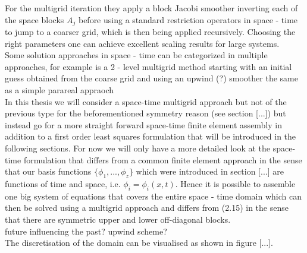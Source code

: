 \documentclass[fleqn, a4paper, 11pt, bibliography=totoc]{report}
\begin{document}
For the multigrid iteration they apply a block Jacobi smoother inverting each of the space blocks $A_j$ before using a standard restriction operators in space - time to jump to a coarser grid, which is then being applied recursively. Choosing the right parameters one can achieve excellent scaling results for large systems. 
\smallskip
\\
Some solution approaches in space - time can be categorized in multiple approaches, for example is a 2 - level multigrid method starting with an initial guess obtained from the coarse grid and using an upwind (?) smoother the same as a simple parareal appraoch \cite{}  
\smallskip
\\
In this thesis we will consider a space-time multigrid approach but not of the previous type for the beforementioned symmetry reason (see section [...]) but instead go for a more straight forward space-time finite element assembly in addition to a first order least squares formulation that will be introduced in the following sections. For now we will only have a more detailed look at the space-time formulation that differs from a common finite element approach in the sense that our basis functions $\{\phi_1, ..., \phi_z\}$ which were introduced in section [...] are functions of time and space, i.e. $\phi_i = \phi_i(x,t)$. Hence it is possible to assemble one big system of equations that covers the entire space - time domain which can then be solved using a multigrid approach and differs from (2.15) in the sense that there are symmetric upper and lower off-diagonal blocks. 
\bigskip
\\
future influencing the past? upwind scheme?
\bigskip
\\
The discretisation of the domain can be visualised as shown in figure [...].
\begin{figure}[ht!]
	\centering
	
	
\end{figure}
\end{document}
